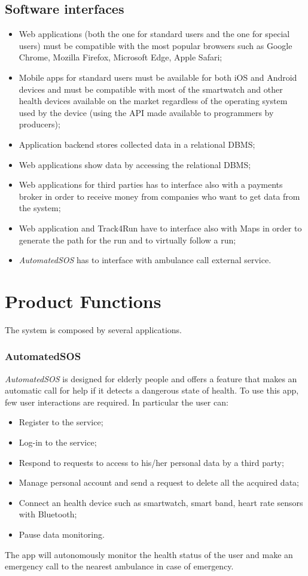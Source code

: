 \subsection{Software interfaces}\label{softwareInterfaces}
\begin{itemize}
\item Web applications (both the one for standard users and the one for special users) must be compatible with the most popular browsers such as Google Chrome, Mozilla Firefox, Microsoft Edge, Apple Safari;
\item	Mobile apps for standard users must be available for both iOS and Android devices and must be compatible with most of the smartwatch and other health devices available on the market regardless of the operating system used by the device (using the API made available to programmers by producers);
\item	Application backend stores collected data in a relational DBMS;
\item	 Web applications show data by accessing the relational DBMS;
\item	 Web applications for third parties has to interface also with a payments broker in order to receive money from companies who want to get data from the system;
\item Web application and Track4Run have to interface also with Maps in order to generate the path for the run and to virtually follow a run;
\item \textit{AutomatedSOS} has to interface with ambulance call external service.
\end{itemize}
\clearpage

\section{Product Functions}
The system is composed by several applications.
\subsubsection{AutomatedSOS}
\textit{AutomatedSOS} is designed for elderly people and offers a feature that makes an automatic call for help if it detects a dangerous state of health.
To use this app, few user interactions are required.
In particular the user can:
\begin{itemize}
\item Register to the service;
\item Log-in to the service;
\item Respond to requests to access to his/her personal data by a third party;
\item Manage personal account and send a request to delete all the acquired data;
\item Connect an health device such as smartwatch, smart band, heart rate sensors with Bluetooth;
\item Pause data monitoring.
\end{itemize}
The app will autonomously monitor the health status of the user and make an emergency call to the nearest ambulance in case of emergency.


